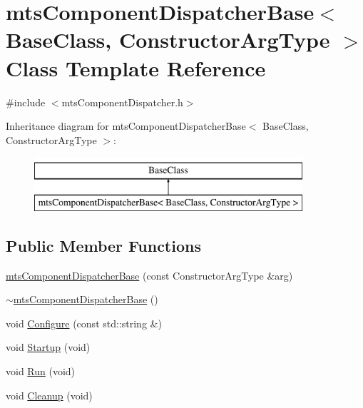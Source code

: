 \hypertarget{classmts_component_dispatcher_base}{}\section{mts\+Component\+Dispatcher\+Base$<$ Base\+Class, Constructor\+Arg\+Type $>$ Class Template Reference}
\label{classmts_component_dispatcher_base}


{\ttfamily \#include $<$mts\+Component\+Dispatcher.\+h$>$}

Inheritance diagram for mts\+Component\+Dispatcher\+Base$<$ Base\+Class, Constructor\+Arg\+Type $>$\+:\begin{figure}[H]
\begin{center}
\leavevmode
\includegraphics[height=2.000000cm]{d7/ddc/classmts_component_dispatcher_base}
\end{center}
\end{figure}
\subsection*{Public Member Functions}
\begin{DoxyCompactItemize}
\item 
\hyperlink{classmts_component_dispatcher_base_a7c7e1d62fd0624cb6cfa68d2f19e9ad6}{mts\+Component\+Dispatcher\+Base} (const Constructor\+Arg\+Type \&arg)
\item 
\hyperlink{classmts_component_dispatcher_base_a6c8fa4889c53b76598f46d7907744d8a}{$\sim$mts\+Component\+Dispatcher\+Base} ()
\item 
void \hyperlink{classmts_component_dispatcher_base_a3bab233437add8ea246931354221157a}{Configure} (const std\+::string \&)
\item 
void \hyperlink{classmts_component_dispatcher_base_a5f99bc60e13834fc91e7dbc4815717aa}{Startup} (void)
\item 
void \hyperlink{classmts_component_dispatcher_base_a0fa8f5eb16dd1bf2ff78ab084f5cc481}{Run} (void)
\item 
void \hyperlink{classmts_component_dispatcher_base_aafe11720b39031ce5548698838005d07}{Cleanup} (void)
\end{DoxyCompactItemize}


